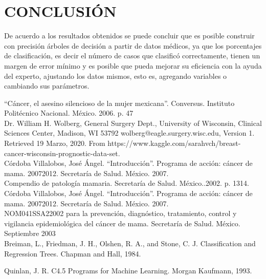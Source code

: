 \documentclass[letterpaper, 10 pt, conference]{ieeeconf}
\begin{document}
\section{CONCLUSIÓN}

De acuerdo a los resultados obtenidos se puede concluir que es posible construir con precisión árboles de decisión a partir de datos médicos, ya que los porcentajes de clasificación, es decir el número de casos que clasificó correctamente, tienen un margen de error mínimo y es posible que pueda mejorar su eficiencia con la ayuda del experto, ajustando los datos mismos, esto es, agregando variables o cambiando sus parámetros.\\

\begin{thebibliography}{}

 “Cáncer, el asesino silencioso de la mujer mexicana”. Conversus. Instituto Politécnico Nacional. México. 2006. p. 47\\

 Dr. William H. Wolberg, General Surgery Dept., University of Wisconsin,  Clinical Sciences Center, Madison, WI 53792
wolberg@eagle.surgery.wisc.edu, Version 1. Retrieved 19 Marzo, 2020. From https://www.kaggle.com/sarahvch/breast-cancer-wisconsin-prognostic-data-set.\\

 Córdoba Villalobos, José Ángel. “Introducción”. Programa de acción: cáncer de mama. 2007­2012. Secretaría de Salud. México. 2007.\\

 Compendio de patología mamaria. Secretaría de Salud. México..2002. p. 13­14.\\

\bibitem{} Córdoba Villalobos, José Ángel. “Introducción”. Programa de acción: cáncer de mama. 2007­2012. Secretaría de Salud. México. 2007.\\

\bibitem{} NOM­041­SSA2­2002 para la prevención, diagnóstico, tratamiento, control y vigilancia epidemiológica del cáncer de mama. Secretaría de Salud. México. Septiembre 2003\\

\bibitem{} Breiman, L., Friedman, J. H., Olshen, R. A., and Stone, C. J.
Classification and Regression Trees. Chapman and Hall, 1984.

\bibitem{} Quinlan, J. R. C4.5 Programs for Machine Learning. Morgan Kaufmann, 1993.

\end{thebibliography}{}
\end{document}
